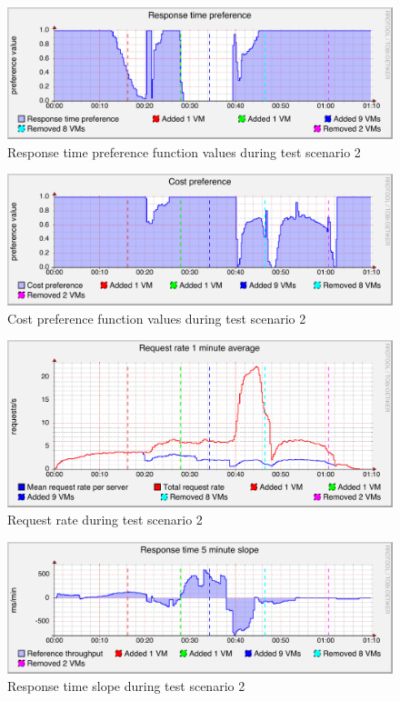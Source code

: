 \documentclass[english]{tktltiki2}
\theoremstyle{definition}
\theoremstyle{remark}
\begin{document}
\begin{figure}[htbp]
	\includegraphics[width=\textwidth]{images/responsetimepreferencegraph-test23}
	\caption{Response time preference function values during test scenario 2}
	\label{fig:responseTimePreferenceScenario2}
\end{figure}

\begin{figure}[htbp]
	\includegraphics[width=\textwidth]{images/costpreferencegraph-test23}
	\caption{Cost preference function values during test scenario 2}
	\label{fig:costPreferenceScenario2}
\end{figure}

\begin{figure}[htbp]
	\includegraphics[width=\textwidth]{images/requestrategraph-test23}
	\caption{Request rate during test scenario 2}
	\label{fig:requestRateScenario2}
\end{figure}

\begin{figure}[htbp]
	\includegraphics[width=\textwidth]{images/responsetimeslopegraph-test23}
	\caption{Response time slope during test scenario 2}
	\label{fig:responseTimeSlopeScenario2}
\end{figure}
\end{document}
